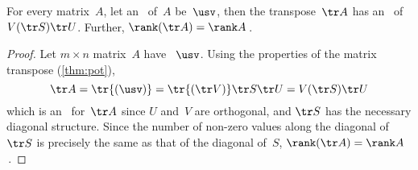 \begin{theorem} \label{thm:ranktr} 
For every matrix~\(A\), let an \svd\ of~\(A\) be~\(\usv\), then the transpose~\(\tr A\) has an \svd\ of \(V(\tr S)\tr U\). 
Further, \(\rank(\tr A)=\rank A\)\,.
\end{theorem}
\begin{proof} 
Let \(m\times n\) matrix~\(A\) have \svd~\(\usv\).  
Using the properties of the matrix transpose (\autoref{thm:pot}),
\begin{equation*}
\tr A=\tr{(\usv)}
=\tr{(\tr V)}\tr S\tr U
=V(\tr S)\tr U
\end{equation*}
which is an \svd\ for~\(\tr A\) since \(U\) and~\(V\) are orthogonal, and \(\tr S\) has the necessary diagonal structure. 
Since the number of non-zero values along the diagonal of~\(\tr S\) is precisely the same as that of the diagonal of~\(S\), \(\rank(\tr A)=\rank A\)\,.
\end{proof}



